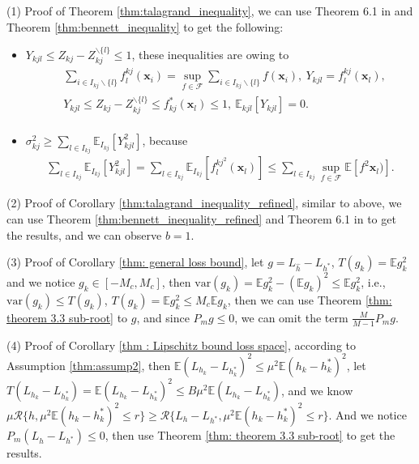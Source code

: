\documentclass{article}
\def\vx{{\mathbf{x}}}
\def\eE{\mathbb{E}}
\begin{document}
(1) Proof of Theorem \ref{thm:talagrand_inequality}, we can use Theorem 6.1 in \cite{bousquet2003concentration} and Theorem \ref{thm:bennett_inequality} to get the following: 
\begin{itemize}
    \item $ Y_{kjl} \leq Z_{kj}-Z_{kj}^{\backslash \{ l \} } \leq 1$, these inequalities are owing to 
    \begin{align*}
        & \sum_{i \in I_{kj} \backslash \{l \} } f_l^{kj}(\vx_i)  = \sup_{f \in \mathcal{F}} \sum_{i \in I_{kj} \backslash \{l \}} f(\vx_i), ~
         Y_{kjl} = f_l^{kj}(\vx_l),  \\
        & Y_{kjl} \leq Z_{kj}-Z_{kj}^{\backslash \{ l \} } \leq f_{kj}^*(\vx_l) \leq 1, ~
        \eE_{kjl} [Y_{kjl}] = 0. \\ 
    \end{align*}    

    \item $\sigma_{kj}^2 \geq \sum_{l \in I_{kj}} \eE _{I_{kj}} [Y_{kjl}^2]$, because
    \begin{align*}
        \sum_{l \in I_{kj}} \eE _{I_{kj}} [Y_{kjl}^2] = \sum_{l \in I_{kj}} \eE _{I_{kj}} [f_l^{{kj}^2}(\vx_l)] \leq \sum_{l \in I_{kj}} \sup_{f \in \mathcal{F}} \eE [f^2 \vx_l)].
    \end{align*}
\end{itemize}

(2) Proof of Corollary \ref{thm:talagrand_inequality_refined}, similar to above, we can use Theorem \ref{thm:bennett_inequality_refined} and Theorem 6.1 in \cite{bousquet2003concentration} to get the results, and we can observe $b = 1$. 

(3) Proof of Corollary \ref{thm: general loss bound}, let $g = L_{\hat{h}} - L_{h^*}$, $T(g_k) = \eE g_k^2$ and we notice $g_k \in [-M_c,M_c]$, 
then $\mathrm{var}(g_k) = \eE g_k^2 - (\eE g_k)^2 \leq \eE g_k^2$, i.e., $ \mathrm{var}(g_k) \leq T(g_k) $, $T(g_k) = \eE g_k^2 \leq M_c \eE g_k$,
then we can use Theorem \ref{thm: theorem 3.3 sub-root} to $g$, and since $P_m g  \leq 0$, we can omit the term $\frac{M}{M-1} P_m g$.

(4) Proof of Corollary \ref{thm : Lipschitz bound loss space}, according to Assumption \ref{thm:assump2}, then $\eE (L_{h_k} - L_{h_k^*})^2 \leq \mu^2 \eE (h_k - h_k^*)^2$, let $T(L_{h_k} - L_{h_k^*}) = \eE (L_{h_k} - L_{h_k^*})^2 \leq B \mu ^2 \eE (L_{h_k} - L_{h_k^*}) $, and we know $\mu \mathcal{R} \{ h,\mu^2 \eE(h_k - h_k^*) ^2 \leq r \} \geq \mathcal{R} \{ L_h - L_{h^*}, \mu ^2 \eE (h_k - h_k^*)^2 \leq r \}$. And we notice $P _m(L_{\hat{h}} - L_{h^*}) \leq 0 $, then use Theorem \ref{thm: theorem 3.3 sub-root} to get the results.
\end{document}
